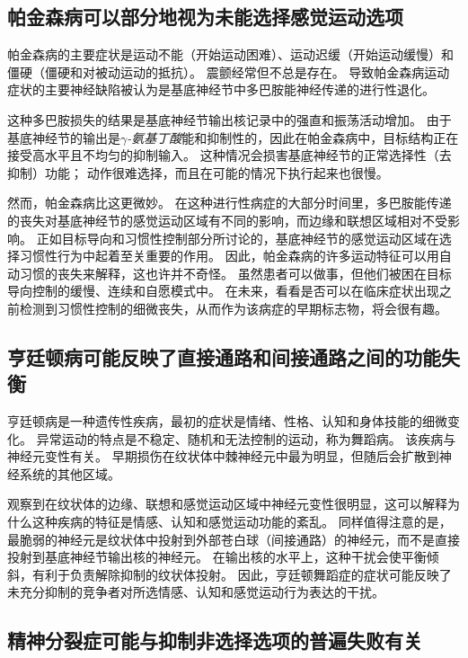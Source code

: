 \subsection{帕金森病可以部分地视为未能选择感觉运动选项}

帕金森病的主要症状是运动不能（开始运动困难）、运动迟缓（开始运动缓慢）和僵硬（僵硬和对被动运动的抵抗）。 震颤经常但不总是存在。
导致帕金森病运动症状的主要神经缺陷被认为是基底神经节中多巴胺能神经传递的进行性退化。


这种多巴胺损失的结果是基底神经节输出核记录中的强直和振荡活动增加。
由于基底神经节的输出是\textit{$\gamma$-氨基丁酸}能和抑制性的，因此在帕金森病中，目标结构正在接受高水平且不均匀的抑制输入。
这种情况会损害基底神经节的正常选择性（去抑制）功能； 动作很难选择，而且在可能的情况下执行起来也很慢。


然而，帕金森病比这更微妙。
在这种进行性病症的大部分时间里，多巴胺能传递的丧失对基底神经节的感觉运动区域有不同的影响，而边缘和联想区域相对不受影响。
正如目标导向和习惯性控制部分所讨论的，基底神经节的感觉运动区域在选择习惯性行为中起着至关重要的作用。
因此，帕金森病的许多运动特征可以用自动习惯的丧失来解释，这也许并不奇怪。
虽然患者可以做事，但他们被困在目标导向控制的缓慢、连续和自愿模式中。
在未来，看看是否可以在临床症状出现之前检测到习惯性控制的细微丧失，从而作为该病症的早期标志物，将会很有趣。



\subsection{亨廷顿病可能反映了直接通路和间接通路之间的功能失衡}

亨廷顿病是一种遗传性疾病，最初的症状是情绪、性格、认知和身体技能的细微变化。
异常运动的特点是不稳定、随机和无法控制的运动，称为舞蹈病。
该疾病与神经元变性有关。
早期损伤在纹状体中棘神经元中最为明显，但随后会扩散到神经系统的其他区域。


观察到在纹状体的边缘、联想和感觉运动区域中神经元变性很明显，这可以解释为什么这种疾病的特征是情感、认知和感觉运动功能的紊乱。
同样值得注意的是，最脆弱的神经元是纹状体中投射到外部苍白球（间接通路）的神经元，而不是直接投射到基底神经节输出核的神经元。
在输出核的水平上，这种干扰会使平衡倾斜，有利于负责解除抑制的纹状体投射。
因此，亨廷顿舞蹈症的症状可能反映了未充分抑制的竞争者对所选情感、认知和感觉运动行为表达的干扰。



\subsection{精神分裂症可能与抑制非选择选项的普遍失败有关}

